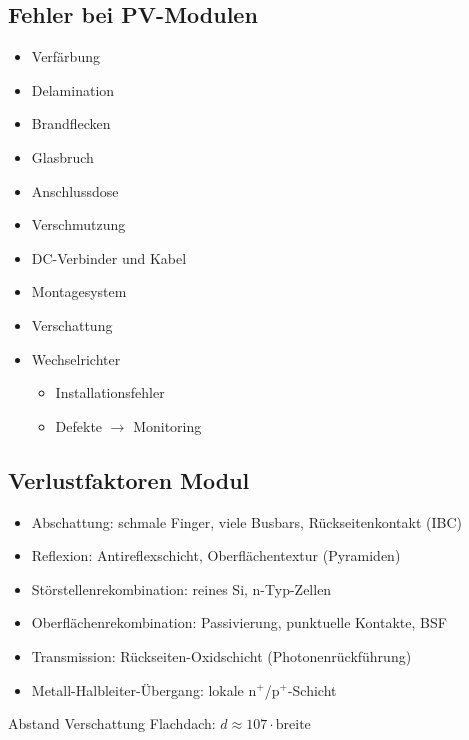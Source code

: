   \subsection{Fehler bei PV-Modulen}
\begin{minipage}[c]{0.49\columnwidth}
\begin{itemize}
    \item Verfärbung
    \item Delamination
    \item Brandflecken
    \item Glasbruch
    \item Anschlussdose
    \item Verschmutzung
\end{itemize}
\end{minipage}
\begin{minipage}[c]{0.49\columnwidth}
\begin{itemize}
    \item DC-Verbinder und Kabel
    \item Montagesystem
    \item Verschattung
    \item Wechselrichter
    \begin{itemize}
        \item Installationsfehler
        \item Defekte $\rightarrow$ Monitoring
    \end{itemize}
  \end{itemize}
\end{minipage}
\subsection{Verlustfaktoren Modul}
\begin{itemize}
  \item Abschattung: schmale Finger, viele Busbars, Rückseitenkontakt (IBC)
  \item Reflexion: Antireflexschicht, Oberflächentextur (Pyramiden)
  \item Störstellenrekombination: reines Si, n-Typ-Zellen
  \item Oberflächenrekombination: Passivierung, punktuelle Kontakte, BSF
  \item Transmission: Rückseiten-Oxidschicht (Photonenrückführung)
  \item Metall-Halbleiter-Übergang: lokale n$^+$/p$^+$-Schicht
\end{itemize}

Abstand Verschattung Flachdach: $\boxed{d\approx 107 \cdot \text{breite}}$\\

